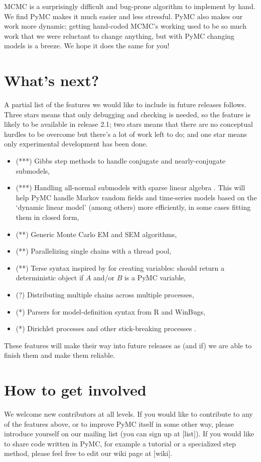 
MCMC is a surprisingly difficult and bug-prone algorithm to implement by hand. We find PyMC makes it much easier and less stressful. PyMC also makes our work more dynamic; getting hand-coded MCMC's working used to be so much work that we were reluctant to change anything, but with PyMC changing models is a breeze. We hope it does the same for you!

\hypertarget{whatsnext}{}
\section*{What's next?} %

A partial list of the features we would like to include in future releases follows. Three stars means that only debugging and checking is needed, so the feature is likely to be available in release 2.1; two stars means that there are no conceptual hurdles to be overcome but there's a lot of work left to do; and one star means only experimental development has been done.
\begin{itemize}
   \item (***) Gibbs step methods to handle conjugate and nearly-conjugate submodels,
   \item (***) Handling all-normal submodels with sparse linear algebra \citep{normalsubmodel}. This will help PyMC handle Markov random fields and time-series models based on the `dynamic linear model' \citep{westharrison} (among others) more efficiently, in some cases fitting them in closed form,
   \item (**) Generic Monte Carlo EM and SEM algorithms,   
   \item (**) Parallelizing single chains with a thread pool,
   \item (**) Terse syntax inspired by \cite{fbc} for creating variables:  should return a deterministic object if $A$ and/or $B$ is a PyMC variable,   
   \item (?) Distributing multiple chains across multiple processes,
   \item (*) Parsers for model-definition syntax from R and WinBugs,
   \item (*) Dirichlet processes and other stick-breaking processes \citep{stickbreak}.
\end{itemize}
These features will make their way into future releases as (and if) we are able to finish them and make them reliable.

\hypertarget{getinvolved}{}
\section*{How to get involved} %

We welcome new contributors at all levels. If you would like to contribute to any of the features above, or to improve PyMC itself in some other way, please introduce yourself on our mailing list (you can sign up at [list]). If you would like to share code written in PyMC, for example a tutorial or a specialized step method, please feel free to edit our wiki page at [wiki]. 